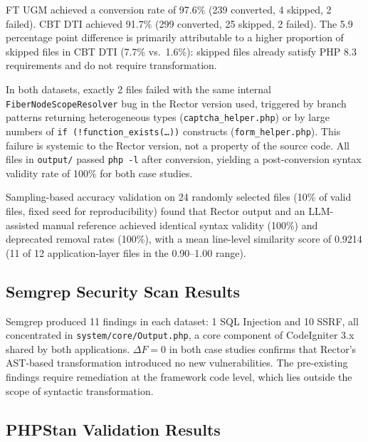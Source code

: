 \documentclass[conference]{IEEEtran}
\begin{document}
FT UGM achieved a conversion rate of 97.6\% (239 converted,
4 skipped, 2 failed). CBT DTI achieved 91.7\% (299 converted,
25 skipped, 2 failed). The 5.9 percentage point difference is
primarily attributable to a higher proportion of skipped files
in CBT DTI (7.7\% vs.\ 1.6\%): skipped files already satisfy
PHP 8.3 requirements and do not require transformation.

In both datasets, exactly 2 files failed with the same internal
\texttt{FiberNodeScopeResolver} bug in the Rector version used,
triggered by branch patterns returning heterogeneous types
(\texttt{captcha\_helper.php}) or by large numbers of
\texttt{if (!function\_exists(\ldots))} constructs
(\texttt{form\_helper.php}). This failure is systemic to the
Rector version, not a property of the source code. All files
in \texttt{output/} passed \texttt{php -l} after conversion,
yielding a post-conversion syntax validity rate of 100\% for
both case studies.

Sampling-based accuracy validation on 24 randomly selected files
(10\% of valid files, fixed seed for reproducibility) found that
Rector output and an LLM-assisted
manual reference achieved identical syntax validity (100\%) and
deprecated removal rates (100\%), with a mean line-level
similarity score of 0.9214 (11 of 12 application-layer files
in the 0.90--1.00 range).

\subsection{Semgrep Security Scan Results}

Semgrep produced 11 findings in each dataset: 1 SQL Injection
and 10 SSRF, all concentrated in
\texttt{system/core/Output.php}, a core component of
CodeIgniter 3.x shared by both applications.
$\Delta F = 0$ in both case studies confirms that Rector's
AST-based transformation introduced no new vulnerabilities.
The pre-existing findings require remediation at the framework
code level, which lies outside the scope of syntactic
transformation.

\subsection{PHPStan Validation Results}
\end{document}
